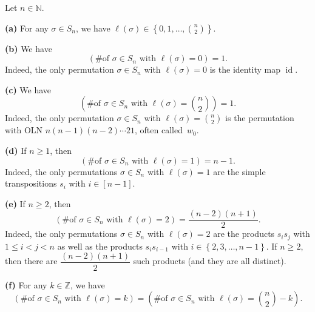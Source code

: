 \begin{proposition}
\label{prop.perm.lengths-k-small-k}
\leantarget
\leanok
Let $n\in\mathbb{N}$. \medskip

\textbf{(a)} For any $\sigma\in S_{n}$, we have $\ell\left(\sigma\right)
\in\left\{0,1,\ldots,\binom{n}{2}\right\}$.
\leanok
\medskip

\textbf{(b)} We have
\[
\left(\text{\# of }\sigma\in S_{n}\text{ with }\ell\left(\sigma\right)
=0\right) = 1.
\]
Indeed, the only permutation $\sigma\in S_{n}$ with $\ell\left(
\sigma\right)=0$ is the identity map $\operatorname{id}$.
\leanok
\medskip

\textbf{(c)} We have
\[
\left(\text{\# of }\sigma\in S_{n}\text{ with }\ell\left(\sigma\right)
=\binom{n}{2}\right) = 1.
\]
Indeed, the only permutation $\sigma\in S_{n}$ with $\ell\left(
\sigma\right)=\binom{n}{2}$ is the permutation with OLN $n\left(
n-1\right)\left(n-2\right)\cdots21$, often called~$w_{0}$.
\leanok
\medskip

\textbf{(d)} If $n\geq1$, then
\[
\left(\text{\# of }\sigma\in S_{n}\text{ with }\ell\left(\sigma\right)
=1\right) = n-1.
\]
Indeed, the only permutations $\sigma\in S_{n}$ with $\ell\left(
\sigma\right)=1$ are the simple transpositions $s_{i}$ with $i\in\left[
n-1\right]$.
\leanok
\medskip

\textbf{(e)} If $n\geq2$, then
\[
\left(\text{\# of }\sigma\in S_{n}\text{ with }\ell\left(\sigma\right)
=2\right) = \dfrac{\left(n-2\right)\left(n+1\right)}{2}.
\]
Indeed, the only permutations $\sigma\in S_{n}$ with $\ell\left(
\sigma\right)=2$ are the products $s_{i}s_{j}$ with $1\leq i<j<n$ as well as
the products $s_{i}s_{i-1}$ with $i\in\left\{2,3,\ldots,n-1\right\}$. If
$n\geq2$, then there are $\dfrac{\left(n-2\right)\left(n+1\right)}{2}$
such products (and they are all distinct).
\leanok
\medskip

\textbf{(f)} For any $k\in\mathbb{Z}$, we have
\[
\left(\text{\# of }\sigma\in S_{n}\text{ with }\ell\left(\sigma\right)
=k\right) = \left(\text{\# of }\sigma\in S_{n}\text{ with }\ell\left(
\sigma\right)=\binom{n}{2}-k\right).
\]
\leanok
\end{proposition}

